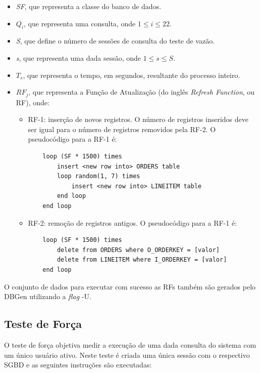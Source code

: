 \begin{itemize}
	\item \textit{SF}, que representa a classe do banco de dados.
	\item \textit{$Q_{i}$}, que representa uma consulta, onde \mbox{$1 \le i \le 22$}.
	\item \textit{S}, que define o número de sessões de consulta do teste de vazão.
	\item \textit{s}, que representa uma dada sessão, onde \mbox{$1 \le s \le S$}.
	\item \textit{$T_{s}$}, que representa o tempo, em segundos, resultante do processo inteiro.
	\item \textit{$RF_{j}$}, que representa a Função de Atualização (do inglês \textit{Refresh Function}, ou RF), onde:
		\begin{itemize}
		    \item RF-1: inserção de novos registros. O número de registros inseridos deve ser igual para o número de registros removidos pela RF-2. O pseudocódigo para a RF-1 é:
		
\begin{verbatim}
    loop (SF * 1500) times
        insert <new row into> ORDERS table
        loop random(1, 7) times
            insert <new row into> LINEITEM table
        end loop
    end loop
\end{verbatim}
		    \item RF-2: remoção de registros antigos. O pseudocódigo para a RF-1 é:
		
\begin{verbatim}
    loop (SF * 1500) times
        delete from ORDERS where O_ORDERKEY = [valor]
        delete from LINEITEM where I_ORDERKEY = [valor]
    end loop
\end{verbatim}
		\end{itemize}
\end{itemize}

O conjunto de dados para executar com sucesso as RFs também são gerados pelo DBGen utilizando a \textit{flag} -U.

\subsection{Teste de Força}
\label{power_test}
O teste de força objetiva medir a execução de uma dada consulta do sistema com um único usuário ativo. Neste teste é criada uma única sessão com o respectivo SGBD e as seguintes instruções são executadas:


